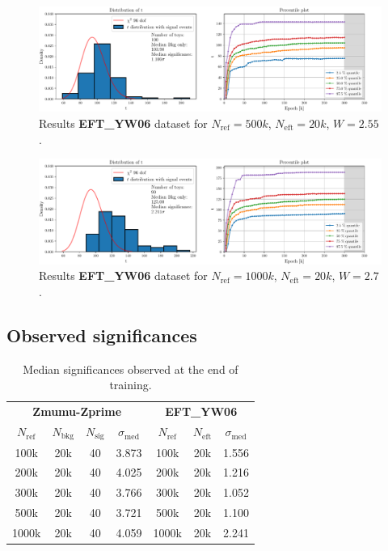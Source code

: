 \vspace{-5mm}
\begin{figure}[H]
	\centering
	\includegraphics[width=1.0\textwidth]{Python/RESULTS/ref500000_bkg0_eft20000/data_ref500000_bkg0_eft20000_wclip2-55.pdf}
	\caption{Results \textbf{EFT\_YW06} dataset for $N_\mathrm{ref}=500\si{k}$, $N_\mathrm{eft}=20\si{k}$, $W=2.55$.}
	\label{fig:REF500000_BKG0_EFT20000_WCLIP2.55}
\end{figure}
\vspace{-5mm}
\begin{figure}[H]
	\centering
	\includegraphics[width=1.0\textwidth]{Python/RESULTS/ref1000000_bkg0_eft20000/data_ref1000000_bkg0_eft20000_wclip2-7.pdf}
	\caption{Results \textbf{EFT\_YW06} dataset for $N_\mathrm{ref}=1000\si{k}$, $N_\mathrm{eft}=20\si{k}$, $W=2.7$.}
	\label{fig:REF1000000_BKG0_EFT20000_WCLIP2.7}
\end{figure}




\subsection*{Observed significances}

\begin{table}[H]
	\centering
	\begin{tabular}{c c c c c c c}
		\toprule
		\toprule
		\multicolumn{4}{c}{\textbf{Zmumu-Zprime}}	&	\multicolumn{3}{c}{\textbf{EFT\_YW06}}	\\
		$N_\mathrm{ref}$	&	$N_\mathrm{bkg}$	&	$N_\mathrm{sig}$	&	$\sigma_\mathrm{med}$	&	$N_\mathrm{ref}$	&	$N_\mathrm{eft}$	&	$\sigma_\mathrm{med}$	\\
		\midrule
		100k	&	20k	&	40	&	3.873	&	100k	&	20k	&	1.556	\\
		200k	&	20k	&	40	&	4.025	&	200k	&	20k	&	1.216	\\
		300k	&	20k	&	40	&	3.766	&	300k	&	20k	&	1.052	\\
		500k	&	20k	&	40	&	3.721	&	500k	&	20k	&	1.100	\\
		1000k	&	20k	&	40	&	4.059	&	1000k	&	20k	&	2.241	\\
		\bottomrule
		\bottomrule	
	\end{tabular}
	\caption{Median significances observed at the end of training.}
	\label{tab:MED_SIG}
\end{table}

